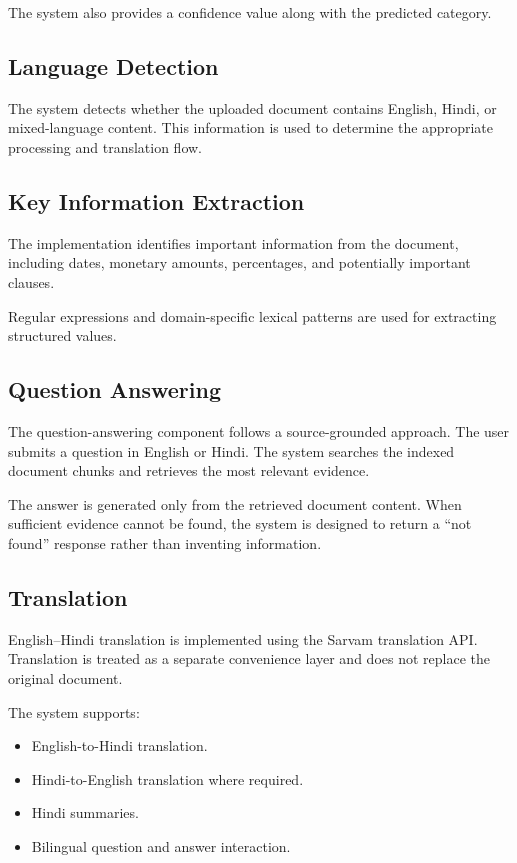 The system also provides a confidence value along with the predicted
category.

\subsection{Language Detection}

The system detects whether the uploaded document contains English,
Hindi, or mixed-language content. This information is used to
determine the appropriate processing and translation flow.

\subsection{Key Information Extraction}

The implementation identifies important information from the
document, including dates, monetary amounts, percentages, and
potentially important clauses.

Regular expressions and domain-specific lexical patterns are used for
extracting structured values.

\subsection{Question Answering}

The question-answering component follows a source-grounded approach.
The user submits a question in English or Hindi. The system searches
the indexed document chunks and retrieves the most relevant evidence.

The answer is generated only from the retrieved document content.
When sufficient evidence cannot be found, the system is designed to
return a ``not found'' response rather than inventing information.

\subsection{Translation}

English--Hindi translation is implemented using the Sarvam translation
API. Translation is treated as a separate convenience layer and does
not replace the original document.

The system supports:

\begin{itemize}
    \item English-to-Hindi translation.
    \item Hindi-to-English translation where required.
    \item Hindi summaries.
    \item Bilingual question and answer interaction.
\end{itemize}

